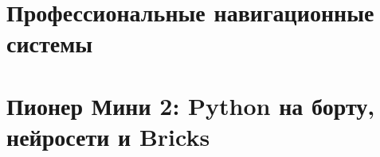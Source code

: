 \documentclass[
    fontsize=11pt,
    parskip=half,
    headings=big,
    numbers=noenddot,
    toc=listof,
    toc=bib,
    headinclude=true,
    footinclude=false
]{scrartcl}
\begin{document}








\clearpage




\clearpage









\clearpage

\part{Профессиональные навигационные системы}


\clearpage

\clearpage

\clearpage

\clearpage

\clearpage

\clearpage

\part{Пионер Мини 2: Python на борту, нейросети и Bricks}









\clearpage

\clearpage

\clearpage
\end{document}
